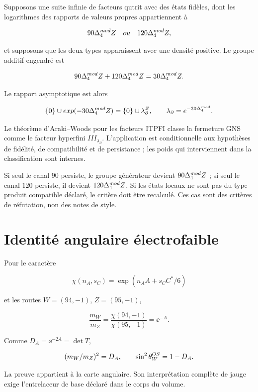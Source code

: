 Supposons une suite infinie de facteurs qutrit avec des états fidèles, dont les logarithmes des rapports de valeurs propres appartiennent à

\[
90\Delta_{4}^{mod}Z\quad ou\quad120\Delta_{4}^{mod}Z,
\]

et supposons que les deux types apparaissent avec une densité positive. Le groupe additif engendré est

\[
90\Delta_{4}^{mod}Z+120\Delta_{4}^{mod}Z=30\Delta_{4}^{mod}Z.
\]

Le rapport asymptotique est alors

\[
\{0\}\cup exp(-30\Delta_{4}^{mod}Z)
=\{0\}\cup\lambda_\partial^Z,
\qquad \lambda_\partial=e^{-30\Delta_{4}^{mod}}.
\]

Le théorème d’Araki--Woods pour les facteurs ITPFI classe la fermeture GNS comme le facteur hyperfini \(III_{\lambda_\partial}\). L’application est conditionnelle aux hypothèses de fidélité, de compatibilité et de persistance ; les poids qui interviennent dans la classification sont internes.

\begin{remark}
Si seul le canal \(90\) persiste, le groupe générateur devient \(90\Delta_{4}^{mod}Z\) ; si seul le canal \(120\) persiste, il devient \(120\Delta_{4}^{mod}Z\). Si les états locaux ne sont pas du type produit compatible déclaré, le critère doit être recalculé. Ces cas sont des critères de réfutation, non des notes de style.
\end{remark}


\section{Identité angulaire électrofaible}

Pour le caractère

\[
\chi(n_A,s_C)=\exp(n_AA+s_CC^*/6)
\]

et les routes \(W=(94,-1)\), \(Z=(95,-1)\),

\[
\frac{m_W}{m_Z}=\frac{\chi(94,-1)}{\chi(95,-1)}
=\ee^{-A}.
\]

Comme \(D_A=\ee^{-2A}=\det T\),

\[
(m_W/m_Z)^2=D_A,\qquad
\sin^2\theta_W^{\rm OS}=1-D_A.
\]

La preuve appartient à la carte angulaire. Son interprétation complète de
jauge exige l’entrelaceur de base déclaré dans le corps du volume.
